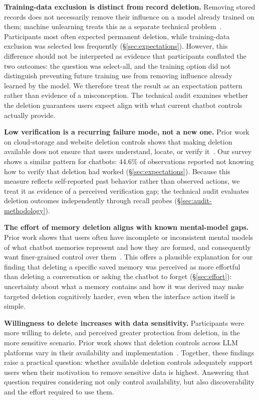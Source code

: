 \documentclass[conference,compsoc]{IEEEtran}
\begin{document}
\textbf{Training-data exclusion is distinct from record deletion.} Removing stored records does not necessarily remove their influence on a model already trained on them; machine unlearning treats this as a separate technical problem~\cite{bourtoule2021machine}. Participants most often expected permanent deletion, while training-data exclusion was selected less frequently (\S\ref{sec:expectations}). However, this difference should not be interpreted as evidence that participants conflated the two outcomes: the question was select-all, and the training option did not distinguish preventing future training use from removing influence already learned by the model. We therefore treat the result as an expectation pattern rather than evidence of a misconception. The technical audit examines whether the deletion guarantees users expect align with what current chatbot controls actually provide.

\textbf{Low verification is a recurring failure mode, not a new one.} Prior work on cloud-storage and website deletion controls shows that making deletion available does not ensure that users understand, locate, or verify it~\cite{ramokapane2017stupid,habib2019empirical}. Our survey shows a similar pattern for chatbots: 44.6\% of observations reported not knowing how to verify that deletion had worked (\S\ref{sec:expectations}). Because this measure reflects self-reported past behavior rather than observed actions, we treat it as evidence of a perceived verification gap; the technical audit evaluates deletion outcomes independently through recall probes (\S\ref{sec:audit-methodology}).

\textbf{The effort of memory deletion aligns with known mental-model gaps.} Prior work shows that users often have incomplete or inconsistent mental models of what chatbot memories represent and how they are formed, and consequently want finer-grained control over them~\cite{zhang2025understanding}. This offers a plausible explanation for our finding that deleting a specific saved memory was perceived as more effortful than deleting a conversation or asking the chatbot to forget (\S\ref{sec:effort}): uncertainty about what a memory contains and how it was derived may make targeted deletion cognitively harder, even when the interface action itself is simple.

\textbf{Willingness to delete increases with data sensitivity.} Participants were more willing to delete, and perceived greater protection from deletion, in the more sensitive scenario. Prior work shows that deletion controls across LLM platforms vary in their availability and implementation~\cite{li2026privacy}. Together, these findings raise a practical question: whether available deletion controls adequately support users when their motivation to remove sensitive data is highest. Answering that question requires considering not only control availability, but also discoverability and the effort required to use them.
\end{document}
